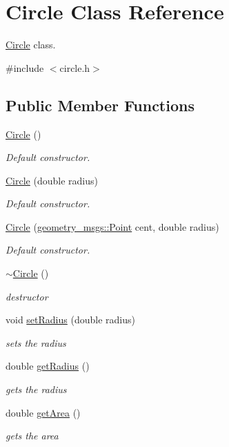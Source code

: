 \hypertarget{classCircle}{}\section{Circle Class Reference}
\label{classCircle}


\hyperlink{classCircle}{Circle} class.  




{\ttfamily \#include $<$circle.\+h$>$}

\subsection*{Public Member Functions}
\begin{DoxyCompactItemize}
\item 
\hyperlink{classCircle_ad1ecfcfc7bf34529c6a6d6c448bf70fe}{Circle} ()
\begin{DoxyCompactList}\small\item\em Default constructor. \end{DoxyCompactList}\item 
\hyperlink{classCircle_a05c707753451188c26b43508b610ff8e}{Circle} (double radius)
\begin{DoxyCompactList}\small\item\em Default constructor. \end{DoxyCompactList}\item 
\hyperlink{classCircle_ac02d550671d464b1fb82733933694f17}{Circle} (\hyperlink{structgeometry__msgs_1_1Point}{geometry\+\_\+msgs\+::\+Point} cent, double radius)
\begin{DoxyCompactList}\small\item\em Default constructor. \end{DoxyCompactList}\item 
\mbox{\label{classCircle_ae3f30436e645d73e368e8ee55f8d1650}} 
\hyperlink{classCircle_ae3f30436e645d73e368e8ee55f8d1650}{$\sim$\+Circle} ()
\begin{DoxyCompactList}\small\item\em destructor \end{DoxyCompactList}\item 
void \hyperlink{classCircle_a7a1b334833a9f468498c804264553f41}{set\+Radius} (double radius)
\begin{DoxyCompactList}\small\item\em sets the radius \end{DoxyCompactList}\item 
double \hyperlink{classCircle_af9fccec77d3a15d63594666dc8501437}{get\+Radius} ()
\begin{DoxyCompactList}\small\item\em gets the radius \end{DoxyCompactList}\item 
double \hyperlink{classCircle_a99fe1cbabbf3a9ccae51832376c5e8d4}{get\+Area} ()
\begin{DoxyCompactList}\small\item\em gets the area \end{DoxyCompactList}\end{DoxyCompactItemize}


